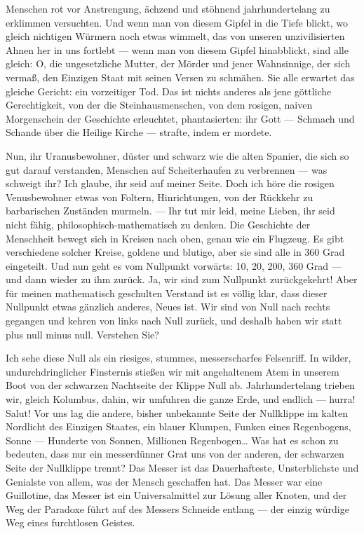 Menschen rot vor Anstrengung, ächzend und stöhnend jahrhundertelang
zu erklimmen versuchten. Und wenn man von diesem Gipfel in die
Tiefe blickt, wo gleich nichtigen Würmern noch etwas wimmelt, das
von unseren unzivilisierten Ahnen her in uns fortlebt — wenn man
von diesem Gipfel hinabblickt, sind alle gleich: O, die
ungesetzliche Mutter, der Mörder und jener Wahnsinnige, der sich
vermaß, den Einzigen Staat mit seinen Versen zu schmähen. Sie alle
erwartet das gleiche Gericht: ein vorzeitiger Tod. Das ist nichts
anderes als jene göttliche Gerechtigkeit, von der die
Steinhausmenschen, von dem rosigen, naiven Morgenschein der
Geschichte erleuchtet, phantasierten: ihr Gott — Schmach und
Schande über die Heilige Kirche — strafte, indem er mordete.

Nun, ihr Uranusbewohner, düster und schwarz wie die alten Spanier,
die sich so gut darauf verstanden, Menschen auf Scheiterhaufen zu
verbrennen — was schweigt ihr? Ich glaube, ihr seid auf meiner
Seite. Doch ich höre die rosigen Venusbewohner etwas von Foltern,
Hinrichtungen, von der Rückkehr zu barbarischen Zuständen murmeln.
— Ihr tut mir leid, meine Lieben, ihr seid nicht fähig,
philosophisch-mathematisch zu denken. Die Geschichte der Menschheit
bewegt sich in Kreisen nach oben, genau wie ein Flugzeug. Es gibt
verschiedene solcher Kreise, goldene und blutige, aber sie sind
alle in 360 Grad eingeteilt. Und nun geht es vom Nullpunkt
vorwärts: 10, 20, 200, 360 Grad — und dann wieder zu ihm zurück.
Ja, wir sind zum Nullpunkt zurückgekehrt! Aber für meinen
mathematisch geschulten Verstand ist es völlig klar, dass dieser
Nullpunkt etwas gänzlich anderes, Neues ist. Wir sind von Null nach
rechts gegangen und kehren von links nach Null zurück, und deshalb
haben wir statt plus null minus null. Verstehen Sie?

Ich sehe diese Null als ein riesiges, stummes, messerscharfes
Felsenriff. In wilder, undurchdringlicher Finsternis stießen wir
mit angehaltenem Atem in unserem Boot von der schwarzen Nachtseite
der Klippe Null ab. Jahrhundertelang trieben wir, gleich Kolumbus,
dahin, wir umfuhren die ganze Erde, und endlich — hurra! Salut! Vor
uns lag die andere, bisher unbekannte Seite der Nullklippe im
kalten Nordlicht des Einzigen Staates, ein blauer Klumpen, Funken
eines Regenbogens, Sonne — Hunderte von Sonnen, Millionen
Regenbogen\ldots{} Was hat es schon zu bedeuten, dass nur ein
messerdünner Grat uns von der anderen, der schwarzen Seite der
Nullklippe trennt? Das Messer ist das Dauerhafteste, Unsterblichste
und Genialste von allem, was der Mensch geschaffen hat. Das Messer
war eine Guillotine, das Messer ist ein Universalmittel zur Lösung
aller Knoten, und der Weg der Paradoxe führt auf des Messers
Schneide entlang — der einzig würdige Weg eines furchtlosen
Geistes.

